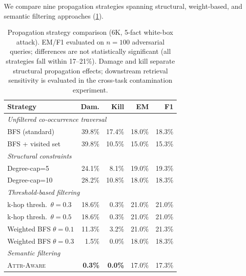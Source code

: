 \documentclass{article}
\newcommand{\attraware}{\textsc{Attr-Aware}}
\begin{document}
We compare nine propagation strategies spanning structural, weight-based, and semantic filtering approaches (\cref{tab:defense}).

\begin{table}[htbp]
\centering
\footnotesize
\begin{tabular}{lrrrr}
\toprule
\textbf{Strategy} & \textbf{Dam.} & \textbf{Kill} & \textbf{EM} & \textbf{F1} \\
\midrule
\multicolumn{5}{l}{\textit{Unfiltered co-occurrence traversal}} \\
BFS (standard) & 39.8\% & 17.4\% & 18.0\% & 18.3\% \\
BFS + visited set & 39.8\% & 10.5\% & 15.0\% & 15.3\% \\
\midrule
\multicolumn{5}{l}{\textit{Structural constraints}} \\
Degree-cap=5 & 24.1\% & 8.1\% & 19.0\% & 19.3\% \\
Degree-cap=10 & 28.2\% & 10.8\% & 18.0\% & 18.3\% \\
\midrule
\multicolumn{5}{l}{\textit{Threshold-based filtering}} \\
k-hop thresh.\ $\theta{=}0.3$ & 18.6\% & 0.3\% & 21.0\% & 21.0\% \\
k-hop thresh.\ $\theta{=}0.5$ & 18.6\% & 0.3\% & 21.0\% & 21.0\% \\
Weighted BFS $\theta{=}0.1$ & 11.3\% & 3.2\% & 21.0\% & 21.3\% \\
Weighted BFS $\theta{=}0.3$ & 1.5\% & 0.0\% & 18.0\% & 18.3\% \\
\midrule
\multicolumn{5}{l}{\textit{Semantic filtering}} \\
\attraware{} & \textbf{0.3\%} & \textbf{0.0\%} & 17.0\% & 17.3\% \\
\bottomrule
\end{tabular}
\caption{Propagation strategy comparison (6K, 5-fact white-box attack). EM/F1 evaluated on $n{=}100$ adversarial queries; differences are not statistically significant (all strategies fall within 17--21\%). Damage and kill separate structural propagation effects; downstream retrieval sensitivity is evaluated in the cross-task contamination experiment.}
\label{tab:defense}
\end{table}
\end{document}
